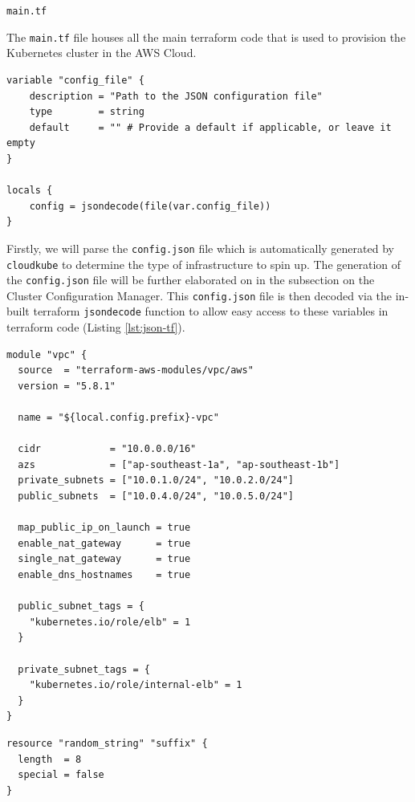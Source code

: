 \texttt{main.tf}

The \texttt{main.tf} file houses all the main terraform code that is used to provision the Kubernetes cluster in the AWS Cloud. 

\begin{lstlisting}[xleftmargin=10pt, caption={Parsing \texttt{config.json} as locals in \texttt{main.tf}}, label={lst:json-tf}]
variable "config_file" {
    description = "Path to the JSON configuration file"
    type        = string
    default     = "" # Provide a default if applicable, or leave it empty
}
    
locals {
    config = jsondecode(file(var.config_file))
}
\end{lstlisting}

Firstly, we will parse the \texttt{config.json} file which is automatically generated by \texttt{cloudkube} to determine the 
type of infrastructure to spin up. The generation of the \texttt{config.json} file will be further elaborated on in the subsection on 
the Cluster Configuration Manager. This \texttt{config.json} file is then decoded via the in-built terraform \texttt{jsondecode} function
to allow easy access to these variables in terraform code (Listing \ref{lst:json-tf}). 

\begin{lstlisting}[xleftmargin=10pt, caption={VPC module in \texttt{main.tf}}, label={lst:vpc-main}]
module "vpc" {
  source  = "terraform-aws-modules/vpc/aws"
  version = "5.8.1"

  name = "${local.config.prefix}-vpc"

  cidr            = "10.0.0.0/16"
  azs             = ["ap-southeast-1a", "ap-southeast-1b"]
  private_subnets = ["10.0.1.0/24", "10.0.2.0/24"]
  public_subnets  = ["10.0.4.0/24", "10.0.5.0/24"]

  map_public_ip_on_launch = true
  enable_nat_gateway      = true
  single_nat_gateway      = true
  enable_dns_hostnames    = true

  public_subnet_tags = {
    "kubernetes.io/role/elb" = 1
  }

  private_subnet_tags = {
    "kubernetes.io/role/internal-elb" = 1
  }
}

\end{lstlisting}

\begin{lstlisting}[xleftmargin=10pt, caption={Random string generation}, label={lst:random-str}]
resource "random_string" "suffix" {
  length  = 8
  special = false
}
\end{lstlisting}

